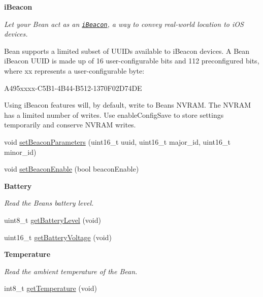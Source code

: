 \begin{Indent}{\bf i\+Beacon}\par
{\em Let your Bean act as an \href{https://developer.apple.com/ibeacon/}{\tt i\+Beacon}, a way to convey real-\/world location to i\+O\+S devices.

Bean supports a limited subset of U\+U\+I\+Ds available to i\+Beacon devices. A Bean i\+Beacon U\+U\+I\+D is made up of 16 user-\/configurable bits and 112 preconfigured bits, where {\ttfamily xx} represents a user-\/configurable byte\+:

{\ttfamily A495xxxx-\/\+C5\+B1-\/4\+B44-\/\+B512-\/1370\+F02\+D74\+D\+E}

Using i\+Beacon features will, by default, write to Bean\textquotesingle{}s N\+V\+R\+A\+M. The N\+V\+R\+A\+M has a limited number of writes. Use {\ttfamily enable\+Config\+Save} to store settings temporarily and conserve N\+V\+R\+A\+M writes. }\begin{DoxyCompactItemize}
\item 
void \hyperlink{class_bean_class_a3b78a7b755cda9f066104f339638d69c}{set\+Beacon\+Parameters} (uint16\+\_\+t uuid, uint16\+\_\+t major\+\_\+id, uint16\+\_\+t minor\+\_\+id)
\item 
void \hyperlink{class_bean_class_a354e2ff36d0e101b35255bae0a5e33ca}{set\+Beacon\+Enable} (bool beacon\+Enable)
\end{DoxyCompactItemize}
\end{Indent}
\begin{Indent}{\bf Battery}\par
{\em Read the Bean\textquotesingle{}s battery level. }\begin{DoxyCompactItemize}
\item 
uint8\+\_\+t \hyperlink{class_bean_class_ac21fd79279f5e25c37609ff15e53cea1}{get\+Battery\+Level} (void)
\item 
uint16\+\_\+t \hyperlink{class_bean_class_a862784d57eca8dd368172612e5e792de}{get\+Battery\+Voltage} (void)
\end{DoxyCompactItemize}
\end{Indent}
\begin{Indent}{\bf Temperature}\par
{\em Read the ambient temperature of the Bean. }\begin{DoxyCompactItemize}
\item 
int8\+\_\+t \hyperlink{class_bean_class_a711e837c145b51a8e95aa22a3fc9bcf9}{get\+Temperature} (void)
\end{DoxyCompactItemize}
\end{Indent}
